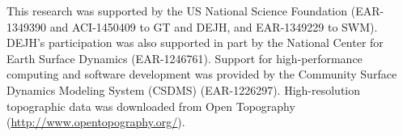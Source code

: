 \documentclass[esurf, manuscript]{copernicus}
\begin{document}



\begin{acknowledgements}
This research was supported by the US National Science Foundation (EAR-1349390 and ACI-1450409 to GT and DEJH, and EAR-1349229 to SWM). DEJH's participation was also supported in part by the National Center for Earth Surface Dynamics (EAR-1246761). Support for high-performance computing and software development was provided by the Community Surface Dynamics Modeling System (CSDMS) (EAR-1226297). High-resolution topographic data was downloaded from Open Topography (\url{http://www.opentopography.org/}).
\end{acknowledgements}













\end{document}
